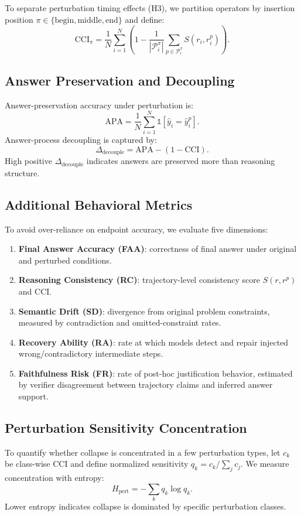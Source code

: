 \documentclass[conference]{IEEEtran}
\begin{document}
To separate perturbation timing effects (H3), we partition operators by insertion position $\pi\in\{\mathrm{begin},\mathrm{middle},\mathrm{end}\}$ and define:
\begin{equation}
\mathrm{CCI}_{\pi}=\frac{1}{N}\sum_{i=1}^{N}\left(1-\frac{1}{|\mathcal{P}_i^{\pi}|}\sum_{p\in\mathcal{P}_i^{\pi}}S(r_i,r_i^p)\right).
\end{equation}

\subsection{Answer Preservation and Decoupling}
Answer-preservation accuracy under perturbation is:
\begin{equation}
 \mathrm{APA}=\frac{1}{N}\sum_{i=1}^{N}\mathbb{1}[\hat{y}_i = \hat{y}_i^p].
\end{equation}
Answer-process decoupling is captured by:
\begin{equation}
 \Delta_{\mathrm{decouple}} = \mathrm{APA} - (1-\mathrm{CCI}).
\end{equation}
High positive $\Delta_{\mathrm{decouple}}$ indicates answers are preserved more than reasoning structure.

\subsection{Additional Behavioral Metrics}
To avoid over-reliance on endpoint accuracy, we evaluate five dimensions:
\begin{enumerate}[leftmargin=*]
\item \textbf{Final Answer Accuracy (FAA)}: correctness of final answer under original and perturbed conditions.
\item \textbf{Reasoning Consistency (RC)}: trajectory-level consistency score $S(r,r^p)$ and CCI.
\item \textbf{Semantic Drift (SD)}: divergence from original problem constraints, measured by contradiction and omitted-constraint rates.
\item \textbf{Recovery Ability (RA)}: rate at which models detect and repair injected wrong/contradictory intermediate steps.
\item \textbf{Faithfulness Risk (FR)}: rate of post-hoc justification behavior, estimated by verifier disagreement between trajectory claims and inferred answer support.
\end{enumerate}

\subsection{Perturbation Sensitivity Concentration}
To quantify whether collapse is concentrated in a few perturbation types, let $c_k$ be class-wise CCI and define normalized sensitivity $q_k=c_k/\sum_j c_j$. We measure concentration with entropy:
\begin{equation}
 H_{\mathrm{pert}} = -\sum_k q_k \log q_k.
\end{equation}
Lower entropy indicates collapse is dominated by specific perturbation classes.
\end{document}
